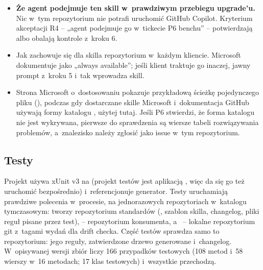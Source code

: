 \begin{itemize}
  \item \textbf{Że agent podejmuje ten skill w~prawdziwym przebiegu upgrade'u.} Nic w~tym
        repozytorium nie potrafi uruchomić GitHub Copilot. Kryterium akceptacji R4 -- „agent
        podejmuje go w~tickecie P6 benchu” -- potwierdzają albo obalają kontrole z~kroku 6.
  \item Jak  zachowuje się dla skilla repozytorium
        w~każdym kliencie. Microsoft dokumentuje  jako „always available”;
        jeśli klient traktuje go inaczej, jawny prompt z~kroku 5 i~tak wprowadza skill.
  \item Strona Microsoft o~dostosowaniu pokazuje przykładową ścieżkę pojedynczego pliku
        (), podczas gdy dostarczane skille Microsoft
        i~dokumentacja GitHub używają formy katalogu , użytej tutaj. Jeśli
        P6 stwierdzi, że forma katalogu nie jest wykrywana, pierwsze do sprawdzenia są wiersze
        tabeli rozwiązywania problemów, a~znalezisko należy zgłosić jako issue w~tym
        repozytorium.
\end{itemize}


\subsection{Testy}\label{sec:standardy-testy}

Projekt  używa xUnit v3 na
 (projekt testów jest aplikacją , więc da się go też
uruchomić bezpośrednio) i~referencjonuje generator. Testy uruchamiają prawdziwe polecenia
w~procesie, na jednorazowych repozytoriach w~katalogu tymczasowym: 
tworzy repozytorium standardów (, szablon skilla, changelog, pliki
reguł pisane przez test),  -- repozytorium konsumenta, a~
-- lokalne repozytorium git z~tagami wydań dla drift checka. Część testów sprawdza samo to
repozytorium: jego reguły, zatwierdzone drzewo generowane i~changelog. W~opisywanej wersji
zbiór liczy 166 przypadków testowych (108 metod \repopath{[Fact]} i~58 wierszy
\repopath{[Theory]} w~16 metodach; 17 klas testowych) i~wszystkie przechodzą.

